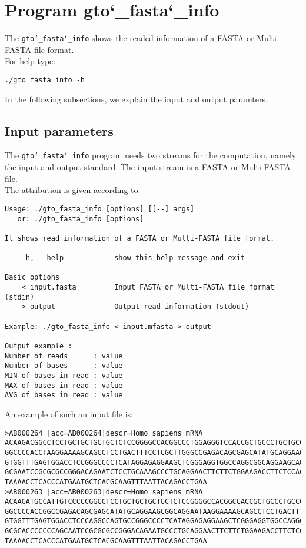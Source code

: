 \section{Program gto\char`_fasta\char`_info}
The \texttt{gto\char`_fasta\char`_info} shows the readed information of a FASTA or Multi-FASTA file format.\\
For help type:
\begin{lstlisting}
./gto_fasta_info -h
\end{lstlisting}
In the following subsections, we explain the input and output paramters.

\subsection*{Input parameters}

The \texttt{gto\char`_fasta\char`_info} program needs two streams for the computation, namely the input and output standard. The input stream is a FASTA or Multi-FASTA file.\\
The attribution is given according to:
\begin{lstlisting}
Usage: ./gto_fasta_info [options] [[--] args]
   or: ./gto_fasta_info [options]

It shows read information of a FASTA or Multi-FASTA file format.

    -h, --help            show this help message and exit

Basic options
    < input.fasta         Input FASTA or Multi-FASTA file format (stdin)
    > output              Output read information (stdout)

Example: ./gto_fasta_info < input.mfasta > output

Output example :
Number of reads      : value
Number of bases      : value
MIN of bases in read : value
MAX of bases in read : value
AVG of bases in read : value
\end{lstlisting}
An example of such an input file is:
\begin{lstlisting}
>AB000264 |acc=AB000264|descr=Homo sapiens mRNA 
ACAAGACGGCCTCCTGCTGCTGCTGCTCTCCGGGGCCACGGCCCTGGAGGGTCCACCGCTGCCCTGCTGCCATTGTCCCC
GGCCCCACCTAAGGAAAAGCAGCCTCCTGACTTTCCTCGCTTGGGCCGAGACAGCGAGCATATGCAGGAAGCGGCAGGAA
GTGGTTTGAGTGGACCTCCGGGCCCCTCATAGGAGAGGAAGCTCGGGAGGTGGCCAGGCGGCAGGAAGCAGGCCAGTGCC
GCGAATCCGCGCGCCGGGACAGAATCTCCTGCAAAGCCCTGCAGGAACTTCTTCTGGAAGACCTTCTCCACCCCCCCAGC
TAAAACCTCACCCATGAATGCTCACGCAAGTTTAATTACAGACCTGAA
>AB000263 |acc=AB000263|descr=Homo sapiens mRNA 
ACAAGATGCCATTGTCCCCCGGCCTCCTGCTGCTGCTGCTCTCCGGGGCCACGGCCACCGCTGCCCTGCCCCTGGAGGGT
GGCCCCACCGGCCGAGACAGCGAGCATATGCAGGAAGCGGCAGGAATAAGGAAAAGCAGCCTCCTGACTTTCCTCGCTTG
GTGGTTTGAGTGGACCTCCCAGGCCAGTGCCGGGCCCCTCATAGGAGAGGAAGCTCGGGAGGTGGCCAGGCGGCAGGAAG
GCGCACCCCCCCAGCAATCCGCGCGCCGGGACAGAATGCCCTGCAGGAACTTCTTCTGGAAGACCTTCTCCTCCTGCAAA
TAAAACCTCACCCATGAATGCTCACGCAAGTTTAATTACAGACCTGAA
\end{lstlisting}

